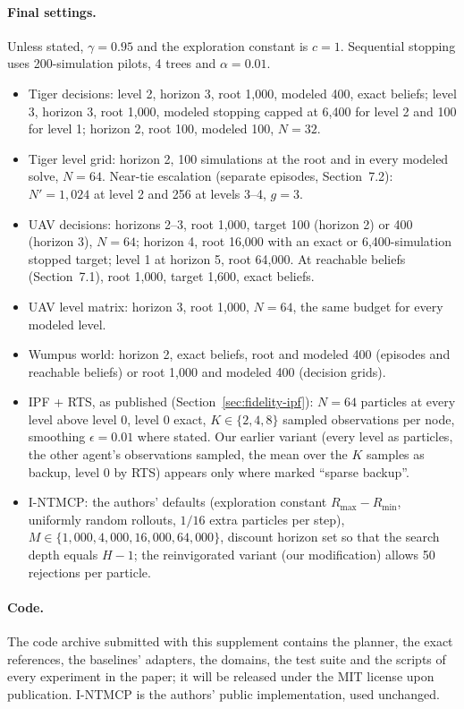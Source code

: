 \documentclass{article}
\begin{document}
\paragraph{Final settings.} Unless stated, $\gamma = 0.95$ and the exploration constant is $c = 1$. Sequential stopping uses 200-simulation pilots, 4 trees and $\alpha = 0.01$.
\begin{itemize}
\item Tiger decisions: level 2, horizon 3, root 1{,}000, modeled 400, exact beliefs; level 3, horizon 3, root 1{,}000, modeled stopping capped at 6{,}400 for level 2 and 100 for level 1; horizon 2, root 100, modeled 100, $N = 32$.
\item Tiger level grid: horizon 2, 100 simulations at the root and in every modeled solve, $N = 64$. Near-tie escalation (separate episodes, Section~7.2): $N' = 1{,}024$ at level 2 and 256 at levels 3--4, $g = 3$.
\item UAV decisions: horizons 2--3, root 1{,}000, target 100 (horizon 2) or 400 (horizon 3), $N = 64$; horizon 4, root 16{,}000 with an exact or 6{,}400-simulation stopped target; level 1 at horizon 5, root 64{,}000. At reachable beliefs (Section~7.1), root 1{,}000, target 1{,}600, exact beliefs.
\item UAV level matrix: horizon 3, root 1{,}000, $N = 64$, the same budget for every modeled level.
\item Wumpus world: horizon 2, exact beliefs, root and modeled 400 (episodes and reachable beliefs) or root 1{,}000 and modeled 400 (decision grids).
\item IPF + RTS, as published (Section~\ref{sec:fidelity-ipf}): $N = 64$ particles at every level above level 0, level 0 exact, $K \in \{2, 4, 8\}$ sampled observations per node, smoothing $\epsilon = 0.01$ where stated. Our earlier variant (every level as particles, the other agent's observations sampled, the mean over the $K$ samples as backup, level 0 by RTS) appears only where marked ``sparse backup''.
\item I-NTMCP: the authors' defaults (exploration constant $R_{\max} - R_{\min}$, uniformly random rollouts, $1/16$ extra particles per step), $M \in \{1{,}000, 4{,}000, 16{,}000, 64{,}000\}$, discount horizon set so that the search depth equals $H - 1$; the reinvigorated variant (our modification) allows 50 rejections per particle.
\end{itemize}

\paragraph{Code.} The code archive submitted with this supplement contains the planner, the exact references, the baselines' adapters, the domains, the test suite and the scripts of every experiment in the paper; it will be released under the MIT license upon publication. I-NTMCP is the authors' public implementation, used unchanged.
\end{document}

